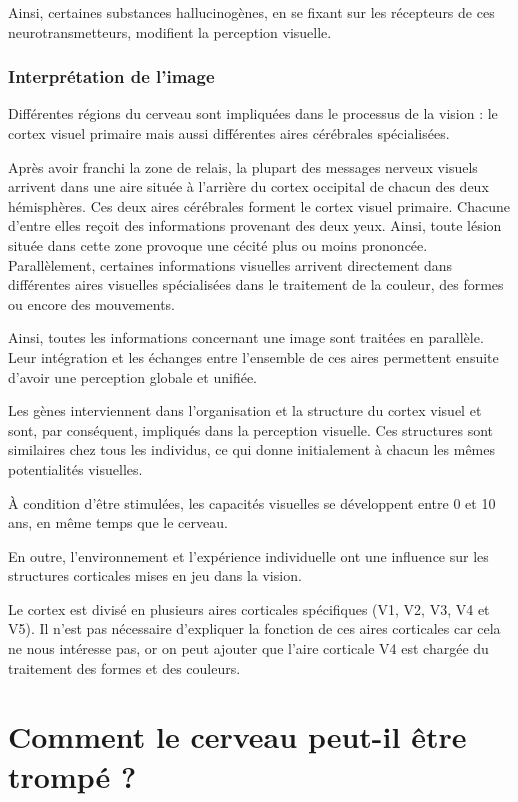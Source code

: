 \documentclass[a4paper, 12pt, onecolumn, openany]{report}
\begin{document}
	Ainsi, certaines substances hallucinogènes, en se fixant sur les récepteurs de ces neurotransmetteurs, modifient la perception visuelle.

		\subsection{Interprétation de l'image}
		Différentes régions du cerveau sont impliquées dans le processus de la vision : le cortex visuel primaire mais aussi différentes aires cérébrales spécialisées.
		
	Après avoir franchi la zone de relais, la plupart des messages nerveux visuels arrivent dans une aire située à l'arrière du cortex occipital de chacun des deux hémisphères. Ces deux aires cérébrales forment le cortex visuel primaire. Chacune d'entre elles reçoit des informations provenant des deux yeux. Ainsi, toute lésion située dans cette zone provoque une cécité plus ou moins prononcée. Parallèlement, certaines informations visuelles arrivent directement dans différentes aires visuelles spécialisées dans le traitement de la couleur, des formes ou encore des mouvements.
	
	Ainsi, toutes les informations concernant une image sont traitées en parallèle. Leur intégration et les échanges entre l'ensemble de ces aires permettent ensuite d'avoir une perception globale et unifiée.
	
	Les gènes interviennent dans l'organisation et la structure du cortex visuel et sont, par conséquent, impliqués dans la perception visuelle. Ces structures sont similaires chez tous les individus, ce qui donne initialement à chacun les mêmes potentialités visuelles.
	
	À condition d'être stimulées, les capacités visuelles se développent entre 0 et 10 ans, en même temps que le cerveau.
	
	En outre, l'environnement et l'expérience individuelle ont une influence sur les structures corticales mises en jeu dans la vision.
	
	Le cortex est divisé en plusieurs aires corticales spécifiques (V1, V2, V3, V4 et V5). Il n'est pas nécessaire d'expliquer la fonction de ces aires corticales car cela ne nous intéresse pas, or on peut ajouter que l'aire corticale V4 est chargée du traitement des formes et des couleurs.

\chapter{Comment le cerveau peut-il être trompé ?}
\end{document}
